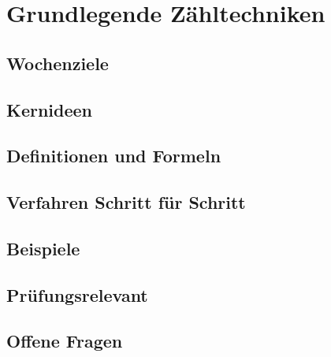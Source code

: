 \chapter{Grundlegende Zähltechniken}
\label{kap:08-zaehltechniken}

\section*{Wochenziele}
\begin{wochenziele}
\end{wochenziele}

\section{Kernideen}

\section{Definitionen und Formeln}

\section{Verfahren Schritt für Schritt}

\section{Beispiele}

\section{Prüfungsrelevant}

\section{Offene Fragen}
